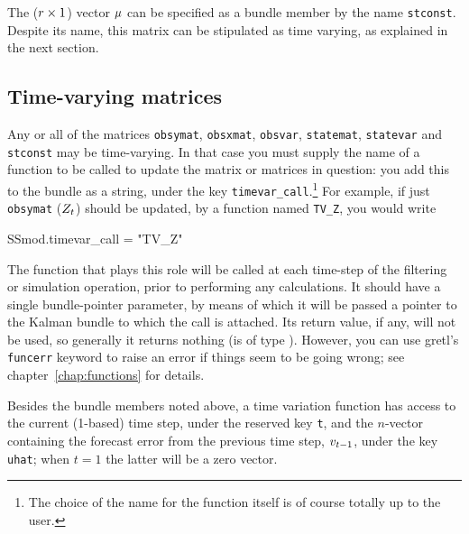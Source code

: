 The ($r \times 1$) vector $\mu$ can be specified as a bundle
member by the name \texttt{stconst}. Despite its name, this matrix can
be stipulated as time varying, as explained in the next section.

\subsection{Time-varying matrices}
\label{sec:tvarying}

Any or all of the matrices \texttt{obsymat}, \texttt{obsxmat},
\texttt{obsvar}, \texttt{statemat}, \texttt{statevar} and
\texttt{stconst} may be time-varying.  In that case you must supply
the name of a function to be called to update the matrix or matrices
in question: you add this to the bundle as a string, under the key
\texttt{timevar\_call}.\footnote{The choice of the name for the
  function itself is of course totally up to the user.} For example,
if just \texttt{obsymat} ($Z_t$) should be updated, by a
function named \texttt{TV\_Z}, you would write
%
\begin{code}
SSmod.timevar_call = "TV_Z"
\end{code}
%
The function that plays this role will be called at each time-step of
the filtering or simulation operation, prior to performing any
calculations. It should have a single bundle-pointer parameter, by
means of which it will be passed a pointer to the Kalman bundle to
which the call is attached.  Its return value, if any, will not be
used, so generally it returns nothing (is of type ).
However, you can use gretl's \texttt{funcerr} keyword to raise an
error if things seem to be going wrong; see
chapter~\ref{chap:functions} for details.

Besides the bundle members noted above, a time variation function has
access to the current (1-based) time step, under the reserved key
\texttt{t}, and the $n$-vector containing the forecast error from the
previous time step, $v_{t-1}$, under the key \texttt{uhat};
when $t=1$ the latter will be a zero vector.

